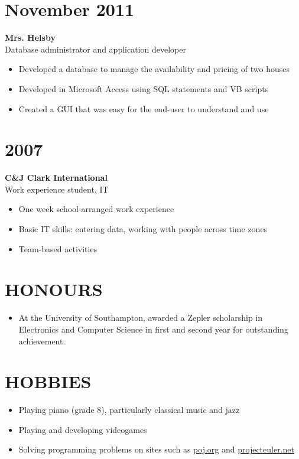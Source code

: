 \documentclass[margin]{res}
\begin{document}
\begin{resume}
\normalsize{\section{November 2011}}
{\bf Mrs. Helsby} \\
Database administrator and application developer \\
\begin{itemize}
\item Developed a database to manage the availability and pricing of two houses
\item Developed in Microsoft Access using SQL statements and VB scripts
\item Created a GUI that was easy for the end-user to understand and use
\end{itemize}

\normalsize{\section{2007}}
{\bf C\&J Clark International} \\
Work experience student, IT \\
\begin{itemize}
\item One week school-arranged work experience
\item Basic IT skills: entering data, working with people across time zones
\item Team-based activities
\end{itemize}

\section{HONOURS}
\begin{itemize}
\item At the University of Southampton, awarded a Zepler scholarship in
Electronics and Computer Science in first and second year for outstanding
achievement.
\end{itemize}

\section{HOBBIES}
\begin{itemize}
\item Playing piano (grade 8), particularly classical music and jazz
\item Playing and developing videogames
\item Solving programming problems on sites such as
\href{http://poj.org/}{poj.org} and
\href{https://projecteuler.net/}{projecteuler.net}
\end{itemize}

\end{resume}
\end{document}

